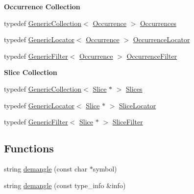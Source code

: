 \begin{Indent}\textbf{ Occurrence Collection}\par
\begin{DoxyCompactItemize}
\item 
typedef \mbox{\hyperlink{classHurricane_1_1GenericCollection}{Generic\+Collection}}$<$ \mbox{\hyperlink{classHurricane_1_1Occurrence}{Occurrence}} $>$ \mbox{\hyperlink{namespaceHurricane_a1912927c128eee859af62dbe4cbe0a6b}{Occurrences}}
\item 
typedef \mbox{\hyperlink{classHurricane_1_1GenericLocator}{Generic\+Locator}}$<$ \mbox{\hyperlink{classHurricane_1_1Occurrence}{Occurrence}} $>$ \mbox{\hyperlink{namespaceHurricane_aa3f9cf43b9c8f3050da0a2549bb3d64d}{Occurrence\+Locator}}
\item 
typedef \mbox{\hyperlink{classHurricane_1_1GenericFilter}{Generic\+Filter}}$<$ \mbox{\hyperlink{classHurricane_1_1Occurrence}{Occurrence}} $>$ \mbox{\hyperlink{namespaceHurricane_a4d74662402bde091565f52b77e261560}{Occurrence\+Filter}}
\end{DoxyCompactItemize}
\end{Indent}
\begin{Indent}\textbf{ Slice Collection}\par
\begin{DoxyCompactItemize}
\item 
typedef \mbox{\hyperlink{classHurricane_1_1GenericCollection}{Generic\+Collection}}$<$ \mbox{\hyperlink{classHurricane_1_1Slice}{Slice}} $\ast$ $>$ \mbox{\hyperlink{namespaceHurricane_aa4a7e8a563c5687621eb5e57ade1706a}{Slices}}
\item 
typedef \mbox{\hyperlink{classHurricane_1_1GenericLocator}{Generic\+Locator}}$<$ \mbox{\hyperlink{classHurricane_1_1Slice}{Slice}} $\ast$ $>$ \mbox{\hyperlink{namespaceHurricane_a5c3b720aae3437342e9d6c57729dc895}{Slice\+Locator}}
\item 
typedef \mbox{\hyperlink{classHurricane_1_1GenericFilter}{Generic\+Filter}}$<$ \mbox{\hyperlink{classHurricane_1_1Slice}{Slice}} $\ast$ $>$ \mbox{\hyperlink{namespaceHurricane_a80703f9d02b235f3291fabbf53f86d4e}{Slice\+Filter}}
\end{DoxyCompactItemize}
\end{Indent}
\subsection*{Functions}
\begin{DoxyCompactItemize}
\item 
string \mbox{\hyperlink{group__Generalities_ga93af87d1b7b19294382ba6dae51d0363}{demangle}} (const char $\ast$symbol)
\item 
string \mbox{\hyperlink{group__Generalities_gae4be209e8a3f2227b0c7a22246817c6f}{demangle}} (const type\+\_\+info \&info)
\end{DoxyCompactItemize}



